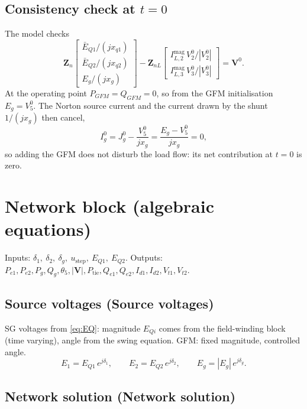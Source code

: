 \documentclass[11pt,a4paper]{article}
\numberwithin{equation}{section}
\newcommand{\blk}[1]{\textsf{#1}}
\begin{document}
\subsection{Consistency check at $t=0$}
The model checks
\begin{equation}
\bm Z_n\begin{bmatrix} \bar E_{Q1}/(jx_{q1})\\ \bar E_{Q2}/(jx_{q2})\\ E_g/(jx_g)\end{bmatrix}
- \bm Z_{nL}\begin{bmatrix} I_{L,2}^{\text{mag}}\,V_2^0/|V_2^0|\\ I_{L,3}^{\text{mag}}\,V_3^0/|V_3^0|\end{bmatrix} = \bm V^0 .
\end{equation}
At the operating point $P_{GFM}=Q_{GFM}=0$, so from the GFM initialisation $E_g = V_5^0$. The Norton source current and the current drawn by the shunt $1/(jx_g)$ then cancel,
\begin{equation}
I_g^0 = J_g^0 - \frac{V_5^0}{jx_g} = \frac{E_g - V_5^0}{jx_g} = 0,
\end{equation}
so adding the GFM does not disturb the load flow: its net contribution at $t=0$ is zero.

\section{Network block (algebraic equations)}
Inputs: $\delta_1,\ \delta_2,\ \delta_g,\ u_{\text{step}},\ E_{Q1},\ E_{Q2}$.
Outputs: $P_{e1}, P_{e2}, P_g, Q_g, \theta_5, |\bm V|, P_{\text{tie}}, Q_{e1}, Q_{e2}, I_{d1}, I_{d2}, V_{t1}, V_{t2}$.

\subsection{Source voltages (\blk{Source voltages})}
SG voltages from \eqref{eq:EQ}: magnitude $E_{Qi}$ comes from the field-winding block (time varying), angle from the swing equation. GFM: fixed magnitude, controlled angle.
\begin{equation}
E_1 = E_{Q1}\,e^{j\delta_1},\qquad
E_2 = E_{Q2}\,e^{j\delta_2},\qquad
E_g = |E_g|\,e^{j\delta_g}.
\end{equation}

\subsection{Network solution (\blk{Network solution})}\label{sec:network-solution}
\end{document}

